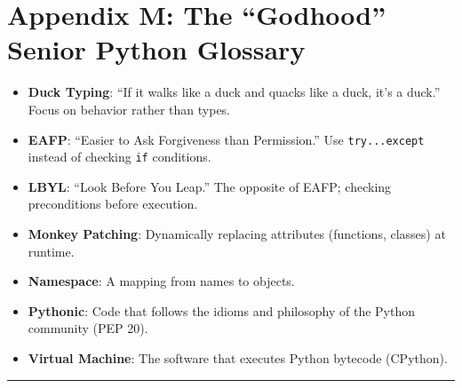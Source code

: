 \hypertarget{appendix-m-the-godhood-senior-python-glossary}{%
\chapter{Appendix M: The ``Godhood'' Senior Python
Glossary}\label{appendix-m-the-godhood-senior-python-glossary}}

\begin{itemize}
\tightlist
\item
  \textbf{Duck Typing}: ``If it walks like a duck and quacks like a
  duck, it's a duck.'' Focus on behavior rather than types.
\item
  \textbf{EAFP}: ``Easier to Ask Forgiveness than Permission.'' Use
  \passthrough{\lstinline!try...except!} instead of checking
  \passthrough{\lstinline!if!} conditions.
\item
  \textbf{LBYL}: ``Look Before You Leap.'' The opposite of EAFP;
  checking preconditions before execution.
\item
  \textbf{Monkey Patching}: Dynamically replacing attributes (functions,
  classes) at runtime.
\item
  \textbf{Namespace}: A mapping from names to objects.
\item
  \textbf{Pythonic}: Code that follows the idioms and philosophy of the
  Python community (PEP 20).
\item
  \textbf{Virtual Machine}: The software that executes Python bytecode
  (CPython).
\end{itemize}

\begin{center}\rule{0.5\linewidth}{0.5pt}\end{center}

